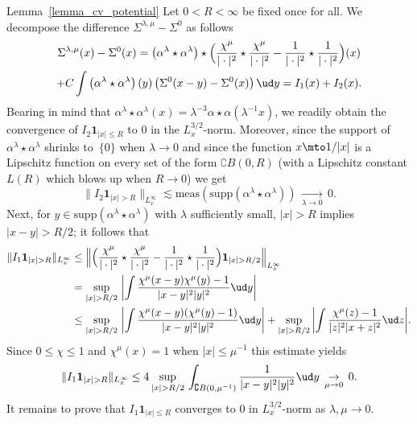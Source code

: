 \begin{ProofOf}{Lemma~\ref{lemma_cv_potential}}
Let $0<R<\infty$ be fixed once for all. We decompose the difference $\Sigma^{\lambda,\mu}-\Sigma^{0}$ as follows
\begin{multline*}
\Sigma^{\lambda,\mu}(x)-\Sigma^{0}(x)=\left(\alpha^{\lambda}\star\alpha^{\lambda}\right)\star\Bigl(\frac{\chi^{\mu}}{|\cdot|^{2}}\star\frac{\chi^{\mu}}{|\cdot|^{2}}-\frac{1}{|\cdot|^{2}}\star\frac{1}{|\cdot|^{2}}\Bigr)(x)\\
+C\int\left(\alpha^{\lambda}\star\alpha^{\lambda}\right)(y)\left(\Sigma^{0}(x-y)-\Sigma^{0}(x)\right)\ud y=I_{1}(x)+I_{2}(x).
\end{multline*}
Bearing in mind that $\alpha^{\lambda}\star\alpha^{\lambda}(x)=\lambda^{-3}\alpha\star\alpha(\lambda^{-1}x)$,
we readily obtain
the convergence of $I_{2}\mathbf{1}_{|x|\leq R}$ to 0 in the $L_{x}^{3/2}$-norm. Moreover, since the support of $\alpha^{\lambda}\star\alpha^{\lambda}$ shrinks to~$\{0\}$ when $\lambda\to 0$ and since the function $x\mto 1/|x|$ is a Lipschitz function on every set of the form $\complement B(0,R)$ (with a Lipschitz constant $L(R)$ which blows up when $R\to 0$) we get
\[
\|I_{2}\mathbf{1}_{|x|>R}\|_{L_{x}^{\infty}}\lesssim\mathrm{meas}\left(\mathrm{supp}\left(\alpha^{\lambda}\star\alpha^{\lambda}\right)\right)\,\underset{\lambda\to 0}{\to}\,0.
\]
Next, for $y\in \mathrm{supp}(\alpha^\lambda\star\alpha^\lambda)$ with $\lambda$ sufficiently small, $|x|>R$ implies $|x-y|>R/2$; it follows that
\begin{align*}
\|I_{1}\mathbf{1}_{|x|>R}\|_{L_{x}^{\infty}}
&\leq\Bigl\|\Bigl(\frac{\chi^{\mu}}{|\cdot|^{2}}\star\frac{\chi^{\mu}}{|\cdot|^{2}}-\frac{1}{|\cdot|^{2}}\star\frac{1}{|\cdot|^{2}}\Bigr)\mathbf{1}_{|x|>R/2}\Bigr\|_{L_{x}^{\infty}}\\
&=\underset{|x|>R/2}{\sup}\,\left|\int\frac{\chi^{\mu}(x-y)\chi^{\mu}(y)-1}{|x-y|^{2}|y|^{2}}\ud y\right|\\
&\leq\underset{|x|>R/2}{\sup}\,\left|\int\frac{\chi^{\mu}(x-y)(\chi^{\mu}(y)-1)}{|x-y|^{2}|y|^{2}}\ud y\right|+\underset{|x|>R/2}{\sup}\,\biggl|\int\frac{\chi^{\mu}(z)-1}{|z|^{2}|x+z|^{2}}\ud z\biggr|.
\end{align*}
Since $0\leq\chi\leq 1$ and $\chi^{\mu}(x)=1$ when $|x|\leq \mu^{-1}$ this estimate yields
\[
\|I_{1}\mathbf{1}_{|x|>R}\|_{L_{x}^{\infty}}\leq 4\,\underset{|x|>R/2}{\sup}\,\int_{\complement B(0,\mu^{-1})}\frac{1}{|x-y|^{2}|y|^{2}}\ud y\,\underset{\mu\to 0}{\to}\,0.
\]
It remains to prove that $I_{1}\mathbf{1}_{|x|\leq R}$ converges to $0$ in $L_{x}^{3/2}$-norm as $\lambda,\mu\to 0$.

\end{ProofOf}
